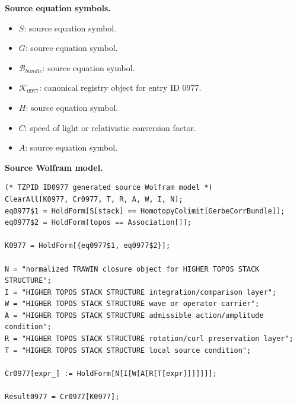 \begin{minipage}[t]{0.49\linewidth}
\begingroup
\small
\raggedright
\textbf{Source equation symbols.}\par
\begin{itemize}[leftmargin=1.35em,itemsep=1pt,topsep=1pt,parsep=0pt]
    \item $S$: source equation symbol.
    \item $G$: source equation symbol.
    \item $\mathcal{B}_{bundle}$: source equation symbol.
    \item $\mathcal{K}_{0977}$: canonical registry object for entry ID 0977.
    \item $H$: source equation symbol.
    \item $C$: speed of light or relativistic conversion factor.
    \item $A$: source equation symbol.
\end{itemize}
\endgroup
\end{minipage}\hfill
\begin{minipage}[t]{0.47\linewidth}
\begingroup
\scriptsize
\raggedright
\textbf{Source Wolfram model.}\par
\begin{Verbatim}[fontsize=\tiny,breaklines=true,breakanywhere=true]
(* TZPID ID0977 generated source Wolfram model *)
ClearAll[K0977, Cr0977, T, R, A, W, I, N];
eq0977$1 = HoldForm[S[stack] == HomotopyColimit[GerbeCorrBundle]];
eq0977$2 = HoldForm[topos == Association[]];

K0977 = HoldForm[{eq0977$1, eq0977$2}];

N = "normalized TRAWIN closure object for HIGHER TOPOS STACK STRUCTURE";
I = "HIGHER TOPOS STACK STRUCTURE integration/comparison layer";
W = "HIGHER TOPOS STACK STRUCTURE wave or operator carrier";
A = "HIGHER TOPOS STACK STRUCTURE admissible action/amplitude condition";
R = "HIGHER TOPOS STACK STRUCTURE rotation/curl preservation layer";
T = "HIGHER TOPOS STACK STRUCTURE local source condition";

Cr0977[expr_] := HoldForm[N[I[W[A[R[T[expr]]]]]]];

Result0977 = Cr0977[K0977];
\end{Verbatim}
\endgroup
\end{minipage}

